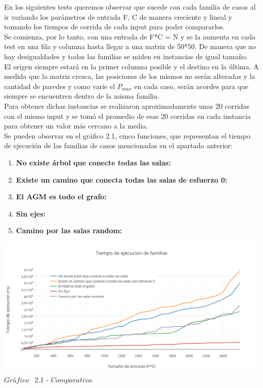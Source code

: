 \indent En los siguientes tests queremos observar que sucede con cada familia de casos al ir variando los parámetros de entrada F, C de manera creciente y lineal y tomando los tiempos de corrida de cada input para poder compararlos.\\
Se comienza, por lo tanto, con una entrada de F*C = N y se la aumenta en cada test en una fila y columna hasta llegar a una matriz de 50*50. De manera que no hay desigualdades y todas las familias se miden en instancias de igual tamaño.\\
El origen siempre estará en la primer columna posible y el destino en la última. A medida que la matriz crezca, las posiciones de los mismos no serán alteradas y la cantidad de paredes y como varie el $P_{max}$ en cada caso, serán acordes para que siempre se encuentren dentro de la misma familia.\\

Para obtener dichas instancias se realizaron aproximadamente unas 20 corridas con el mismo input y se tom\'o el promedio de esas 20 corridas en cada instancia para obtener un valor m\'as cercano a la media.\\ 

Se pueden observar en el  gráfico 2.1, cinco funciones, que representan el tiempo de ejecuci\'on de las familias de casos mencionadas en el apartado anterior:\\

\begin{enumerate}
\item \textbf{No existe árbol que conecte todas las salas:}
\item \textbf{Existe un camino que conecta todas las salas de esfuerzo 0:}
\item \textbf{El AGM es todo el grafo:}
\item \textbf{Sin ejes:}
\item \textbf{Camino por las salas random:}
\end{enumerate}

\vspace*{0.3cm} \vspace*{0.3cm}
  \begin{center}
 \includegraphics[scale=0.65]{./EJ2/comparativo.png}
 {$Gr$\'a$fico$ \ 2.1 - $Comparativo$}
  \end{center}
  \vspace*{0.3cm}
 
